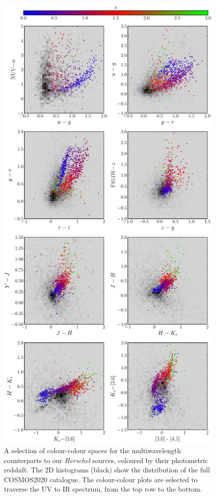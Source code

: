 \begin{figure}
	\centering
	\includegraphics[width=0.85\columnwidth, height=0.9\textheight]{Figures/smg_colours.pdf}
	\caption{A selection of colour-colour spaces for the multiwavelength counterparts to our \textit{Herschel} sources, coloured by their photometric redshift. The 2D histograms (black) show the distribution of the full COSMOS2020 catalogue. The colour-colour plots are selected to traverse the UV to IR spectrum, from the top row to the bottom.}
	\label{fig:smg_colours}
\end{figure}

